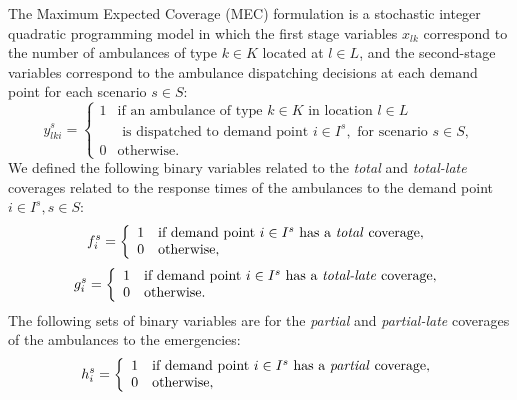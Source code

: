 The Maximum Expected Coverage (MEC) formulation is a stochastic integer quadratic programming model in which the first stage variables $x_{lk}$ correspond to the number of ambulances of type $k\in K$ located at $l\in L$,
and the second-stage variables correspond
to the ambulance dispatching decisions at each demand point for each scenario $s \in S$: %
 \begin{equation*}
       y^s_{lki} = \left\{
       \begin{array}{ll} 
        1 & \text{if an ambulance of type } k\in K \text{ in location } l\in L \\
        & \text{ is dispatched to demand point }i\in I^s, \text{ for scenario }  s\in S, \\
        0 & \text{otherwise}.
       \end{array} \right.
\end{equation*}
We defined the following binary variables related to the \textit{total} and \textit{total-late} coverages related to the response times of the ambulances to the demand point $i\in I^s, s\in S$:
\begin{equation*}
       f^s_{i} = \left\{
       \begin{array}{ll} 
        1 & \text{if demand point  } i\in I^s \text{ has a \textit{total} coverage}, \\
         0 & \text{otherwise},
       \end{array} \right.
\end{equation*}
\begin{equation*}
       g^s_{i} = \left\{
       \begin{array}{ll} 
        1 & \text{if demand point  } i\in I^s \text{ has a \textit{total-late} coverage}, \\
         0 & \text{otherwise}.
       \end{array} \right.
\end{equation*}
The following sets of binary variables are for the \textit{partial} and \textit{partial-late} coverages of the ambulances to the emergencies:
\begin{equation*}
       h^s_{i} = \left\{
       \begin{array}{ll} 
        1 & \text{if demand point  } i\in I^s \text{ has a \textit{partial} coverage}, \\
         0 & \text{otherwise},
       \end{array} \right.
\end{equation*}
